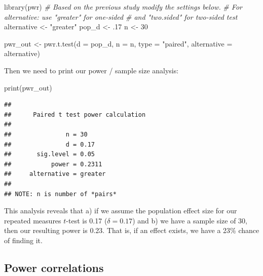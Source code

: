 \documentclass[
]{krantz}
\makeatletter
\newenvironment{Shaded}{\begin{snugshade}}{\end{snugshade}}
\newcommand{\AttributeTok}[1]{\textcolor[rgb]{0.61,0.61,0.61}{#1}}
\newcommand{\CommentTok}[1]{\textcolor[rgb]{0.37,0.37,0.37}{\textit{#1}}}
\newcommand{\DecValTok}[1]{\textcolor[rgb]{0.06,0.06,0.06}{#1}}
\newcommand{\FunctionTok}[1]{\textcolor[rgb]{0,0,0}{#1}}
\newcommand{\NormalTok}[1]{#1}
\newcommand{\OtherTok}[1]{\textcolor[rgb]{0.37,0.37,0.37}{#1}}
\newcommand{\StringTok}[1]{\textcolor[rgb]{0.5,0.5,0.5}{#1}}
\newenvironment{kframe}{%
\medskip{}
\setlength{\fboxsep}{.8em}
 \def\at@end@of@kframe{}%
 \ifinner\ifhmode%
  \def\at@end@of@kframe{\end{minipage}}%
  \begin{minipage}{\columnwidth}%
 \fi\fi%
 \def\FrameCommand##1{\hskip\@totalleftmargin \hskip-\fboxsep
 \colorbox{shadecolor}{##1}\hskip-\fboxsep
     \hskip-\linewidth \hskip-\@totalleftmargin \hskip\columnwidth}%
 \MakeFramed {\advance\hsize-\width
   \@totalleftmargin\z@ \linewidth\hsize
   \@setminipage}}%
 {\par\unskip\endMakeFramed%
 \at@end@of@kframe}
\renewenvironment{Shaded}{\begin{kframe}}{\end{kframe}}
\makeatother
\begin{document}
\begin{Shaded}
\begin{Highlighting}[]
\FunctionTok{library}\NormalTok{(pwr)}
\CommentTok{\# Based on the previous study modify the settings below.}
\CommentTok{\# For alternative: use "greater" for one{-}sided }
\CommentTok{\# and "two.sided" for two{-}sided test}
\NormalTok{alternative }\OtherTok{\textless{}{-}} \StringTok{"greater"}
\NormalTok{pop\_d }\OtherTok{\textless{}{-}}\NormalTok{ .}\DecValTok{17}
\NormalTok{n }\OtherTok{\textless{}{-}} \DecValTok{30}

\NormalTok{pwr\_out }\OtherTok{\textless{}{-}} \FunctionTok{pwr.t.test}\NormalTok{(}\AttributeTok{d =}\NormalTok{ pop\_d, }
                      \AttributeTok{n =}\NormalTok{ n,}
                      \AttributeTok{type =} \StringTok{"paired"}\NormalTok{,}
                      \AttributeTok{alternative =}\NormalTok{ alternative)}
\end{Highlighting}
\end{Shaded}

Then we need to print our power / sample size analysis:

\begin{Shaded}
\begin{Highlighting}[]
\FunctionTok{print}\NormalTok{(pwr\_out)}
\end{Highlighting}
\end{Shaded}

\begin{verbatim}
## 
##      Paired t test power calculation 
## 
##               n = 30
##               d = 0.17
##       sig.level = 0.05
##           power = 0.2311
##     alternative = greater
## 
## NOTE: n is number of *pairs*
\end{verbatim}

This analysis reveals that a) if we assume the population effect size for our repeated measures \(t\)-test is 0.17 (\(\delta = 0.17\)) and b) we have a sample size of 30, then our resulting power is 0.23. That is, if an effect exists, we have a 23\% chance of finding it.

\hypertarget{power-correlations}{%
\subsection{Power correlations}\label{power-correlations}}
\end{document}

